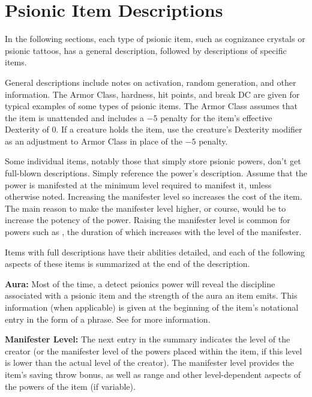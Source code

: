 \section{Psionic Item Descriptions}
In the following sections, each type of psionic item, such as cognizance crystals or psionic tattoos, has a general description, followed by descriptions of specific items.

General descriptions include notes on activation, random generation, and other information. The Armor Class, hardness, hit points, and break DC are given for typical examples of some types of psionic items. The Armor Class assumes that the item is unattended and includes a $-5$ penalty for the item's effective Dexterity of 0. If a creature holds the item, use the creature's Dexterity modifier as an adjustment to Armor Class in place of the $-5$ penalty.

Some individual items, notably those that simply store psionic powers, don't get full-blown descriptions. Simply reference the power's description. Assume that the power is manifested at the minimum level required to manifest it, unless otherwise noted. Increasing the manifester level so increases the cost of the item. The main reason to make the manifester level higher, or course, would be to increase the potency of the power. Raising the manifester level is common for powers such as , the duration of which increases with the level of the manifester.

Items with full descriptions have their abilities detailed, and each of the following aspects of these items is summarized at the end of the description.

\textbf{Aura:} Most of the time, a detect psionics power will reveal the discipline associated with a psionic item and the strength of the aura an item emits. This information (when applicable) is given at the beginning of the item's notational entry in the form of a phrase. See  for more information.%


\textbf{Manifester Level:} The next entry in the summary indicates the level of the creator (or the manifester level of the powers placed within the item, if this level is lower than the actual level of the creator). The manifester level provides the item's saving throw bonus, as well as range and other level-dependent aspects of the powers of the item (if variable).

